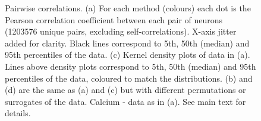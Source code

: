 \documentclass[a4paper]{article}
\begin{document}
\begin{figure}[h!]
\centering
{}%
%

\caption{\label{fig:PCCs} Pairwise correlations. (a) For each method (colours) each dot is the Pearson correlation coefficient between each pair of neurons (1203576 unique pairs, excluding self-correlations). X-axis jitter added for clarity. Black lines correspond to 5th, 50th (median) and 95th percentiles of the data. (c) Kernel density plots of data in (a). Lines above density plots correspond to 5th, 50th (median) and 95th percentiles of the data, coloured to match the distributions. (b) and (d) are the same as (a) and (c) but with different permutations or surrogates of the data. Calcium - data as in (a). See main text for details.}
\end{figure}
\end{document}

